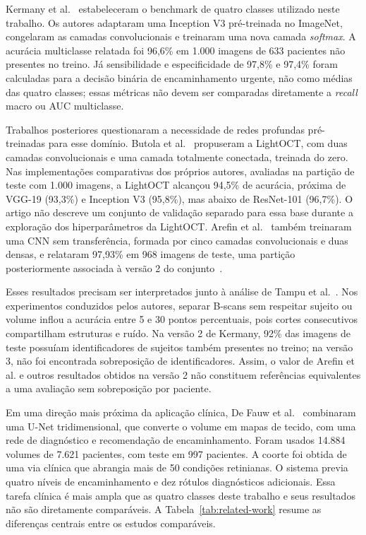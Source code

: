 \documentclass[conference]{IEEEtran}
\begin{document}
Kermany et al.~\cite{kermany2018} estabeleceram o benchmark de quatro classes utilizado neste trabalho. Os autores adaptaram uma Inception V3 pré-treinada no ImageNet, congelaram as camadas convolucionais e treinaram uma nova camada \textit{softmax}. A acurácia multiclasse relatada foi 96,6\% em 1.000 imagens de 633 pacientes não presentes no treino. Já sensibilidade e especificidade de 97,8\% e 97,4\% foram calculadas para a decisão binária de encaminhamento urgente, não como médias das quatro classes; essas métricas não devem ser comparadas diretamente a \textit{recall} macro ou AUC multiclasse.

Trabalhos posteriores questionaram a necessidade de redes profundas pré-treinadas para esse domínio. Butola et al.~\cite{butola2020} propuseram a LightOCT, com duas camadas convolucionais e uma camada totalmente conectada, treinada do zero. Nas implementações comparativas dos próprios autores, avaliadas na partição de teste com 1.000 imagens, a LightOCT alcançou 94,5\% de acurácia, próxima de VGG-19 (93,3\%) e Inception V3 (95,8\%), mas abaixo de ResNet-101 (96,7\%). O artigo não descreve um conjunto de validação separado para essa base durante a exploração dos hiperparâmetros da LightOCT. Arefin et al.~\cite{arefin2021} também treinaram uma CNN sem transferência, formada por cinco camadas convolucionais e duas densas, e relataram 97,93\% em 968 imagens de teste, uma partição posteriormente associada à versão 2 do conjunto~\cite{tampu2022}.

Esses resultados precisam ser interpretados junto à análise de Tampu et al.~\cite{tampu2022}. Nos experimentos conduzidos pelos autores, separar B-scans sem respeitar sujeito ou volume inflou a acurácia entre 5 e 30 pontos percentuais, pois cortes consecutivos compartilham estruturas e ruído. Na versão 2 de Kermany, 92\% das imagens de teste possuíam identificadores de sujeitos também presentes no treino; na versão 3, não foi encontrada sobreposição de identificadores. Assim, o valor de Arefin et al. e outros resultados obtidos na versão 2 não constituem referências equivalentes a uma avaliação sem sobreposição por paciente.

Em uma direção mais próxima da aplicação clínica, De Fauw et al.~\cite{defauw2018} combinaram uma U-Net tridimensional, que converte o volume em mapas de tecido, com uma rede de diagnóstico e recomendação de encaminhamento. Foram usados 14.884 volumes de 7.621 pacientes, com teste em 997 pacientes. A coorte foi obtida de uma via clínica que abrangia mais de 50 condições retinianas. O sistema previa quatro níveis de encaminhamento e dez rótulos diagnósticos adicionais. Essa tarefa clínica é mais ampla que as quatro classes deste trabalho e seus resultados não são diretamente comparáveis. A Tabela~\ref{tab:related-work} resume as diferenças centrais entre os estudos comparáveis.
\end{document}
